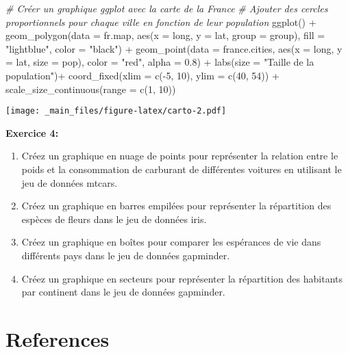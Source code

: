 \documentclass[
]{article}
\newenvironment{Shaded}{\begin{snugshade}}{\end{snugshade}}
\newcommand{\AttributeTok}[1]{\textcolor[rgb]{0.77,0.63,0.00}{#1}}
\newcommand{\CommentTok}[1]{\textcolor[rgb]{0.56,0.35,0.01}{\textit{#1}}}
\newcommand{\DecValTok}[1]{\textcolor[rgb]{0.00,0.00,0.81}{#1}}
\newcommand{\FloatTok}[1]{\textcolor[rgb]{0.00,0.00,0.81}{#1}}
\newcommand{\FunctionTok}[1]{\textcolor[rgb]{0.00,0.00,0.00}{#1}}
\newcommand{\NormalTok}[1]{#1}
\newcommand{\SpecialCharTok}[1]{\textcolor[rgb]{0.00,0.00,0.00}{#1}}
\newcommand{\StringTok}[1]{\textcolor[rgb]{0.31,0.60,0.02}{#1}}
\begin{document}
\begin{Shaded}
\begin{Highlighting}[]
\CommentTok{\# Créer un graphique ggplot avec la carte de la France}
\CommentTok{\# Ajouter des cercles proportionnels pour chaque ville en fonction de leur population}
\FunctionTok{ggplot}\NormalTok{() }\SpecialCharTok{+}
  \FunctionTok{geom\_polygon}\NormalTok{(}\AttributeTok{data =}\NormalTok{ fr.map, }\FunctionTok{aes}\NormalTok{(}\AttributeTok{x =}\NormalTok{ long, }\AttributeTok{y =}\NormalTok{ lat, }\AttributeTok{group =}\NormalTok{ group), }
               \AttributeTok{fill =} \StringTok{"lightblue"}\NormalTok{, }\AttributeTok{color =} \StringTok{"black"}\NormalTok{) }\SpecialCharTok{+}
  \FunctionTok{geom\_point}\NormalTok{(}\AttributeTok{data =}\NormalTok{ france.cities, }\FunctionTok{aes}\NormalTok{(}\AttributeTok{x =}\NormalTok{ long, }\AttributeTok{y =}\NormalTok{ lat, }\AttributeTok{size =}\NormalTok{ pop), }
             \AttributeTok{color =} \StringTok{"red"}\NormalTok{, }\AttributeTok{alpha =} \FloatTok{0.8}\NormalTok{) }\SpecialCharTok{+}
  \FunctionTok{labs}\NormalTok{(}\AttributeTok{size =} \StringTok{"Taille de la population"}\NormalTok{)}\SpecialCharTok{+}
  \FunctionTok{coord\_fixed}\NormalTok{(}\AttributeTok{xlim =} \FunctionTok{c}\NormalTok{(}\SpecialCharTok{{-}}\DecValTok{5}\NormalTok{, }\DecValTok{10}\NormalTok{), }\AttributeTok{ylim =} \FunctionTok{c}\NormalTok{(}\DecValTok{40}\NormalTok{, }\DecValTok{54}\NormalTok{)) }\SpecialCharTok{+}
  \FunctionTok{scale\_size\_continuous}\NormalTok{(}\AttributeTok{range =} \FunctionTok{c}\NormalTok{(}\DecValTok{1}\NormalTok{, }\DecValTok{10}\NormalTok{)) }
\end{Highlighting}
\end{Shaded}

\texttt{[image: \_main\_files/figure-latex/carto-2.pdf]}

\textbf{Exercice 4:}

\begin{enumerate}
\def\labelenumi{\arabic{enumi}.}
\item
  Créez un graphique en nuage de points pour représenter la relation entre le poids et la consommation de carburant de différentes voitures en utilisant le jeu de données mtcars.
\item
  Créez un graphique en barres empilées pour représenter la répartition des espèces de fleurs dans le jeu de données iris.
\item
  Créez un graphique en boîtes pour comparer les espérances de vie dans différents pays dans le jeu de données gapminder.
\item
  Créez un graphique en secteurs pour représenter la répartition des habitants par continent dans le jeu de données gapminder.
\end{enumerate}

\hypertarget{references}{%
\section{References}\label{references}}

  
\end{document}
